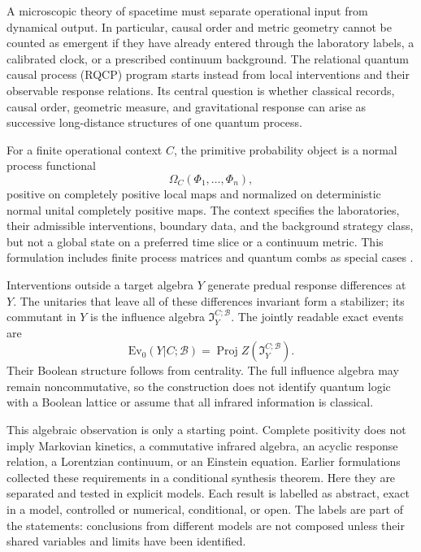\documentclass[11pt]{article}
\newcommand{\B}{\mathcal B}
\newcommand{\I}{\mathfrak I}
\DeclareMathOperator{\Proj}{Proj}
\newcommand{\Ev}{\mathrm{Ev}}
\begin{document}
A microscopic theory of spacetime must separate operational input from
dynamical output.  In particular, causal order and metric geometry cannot be
counted as emergent if they have already entered through the laboratory
labels, a calibrated clock, or a prescribed continuum background.  The
relational quantum causal process (RQCP) program starts instead from local
interventions and their observable response relations.  Its central question
is whether classical records, causal order, geometric measure, and
gravitational response can arise as successive long-distance structures of
one quantum process.

For a finite operational context \(C\), the primitive probability object is a
normal process functional
\[
 \Omega_C(\Phi_1,\ldots,\Phi_n),
\]
positive on completely positive local maps and normalized on deterministic
normal unital completely positive maps.  The context specifies the
laboratories, their admissible interventions, boundary data, and the
background strategy class, but not a global state on a preferred time slice
or a continuum metric.  This formulation includes finite process matrices
and quantum combs as special cases \cite{OCB2012,Chiribella2009}.

Interventions outside a target algebra \(Y\) generate predual response
differences at \(Y\).  The unitaries that leave all of these differences
invariant form a stabilizer; its commutant in \(Y\) is the influence algebra
\(\I_Y^{C;\B}\).  The jointly readable exact events are
\[
 \Ev_0(Y|C;\B)=\Proj Z(\I_Y^{C;\B}).
\]
Their Boolean structure follows from centrality.  The full influence algebra
may remain noncommutative, so the construction does not identify quantum
logic with a Boolean lattice or assume that all infrared information is
classical.

This algebraic observation is only a starting point.  Complete positivity
does not imply Markovian kinetics, a commutative infrared algebra, an acyclic
response relation, a Lorentzian continuum, or an Einstein equation.  Earlier
formulations collected these requirements in a conditional synthesis
theorem.  Here they are separated and tested in explicit models.  Each
result is labelled as abstract, exact in a model, controlled or numerical,
conditional, or open.  The labels are part of the statements: conclusions
from different models are not composed unless their shared variables and
limits have been identified.
\end{document}
